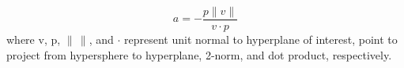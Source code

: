 \begin{equation} \label{eq:linear-proj}
	a=-\frac{p \| v\| }{v\cdot p}
\end{equation}
where $\text{v}$, $\text{p}$, $\| \, \|$, and $\cdot$ represent unit normal to hyperplane of interest, point to project from hypersphere to hyperplane, 2-norm, and dot product, respectively.